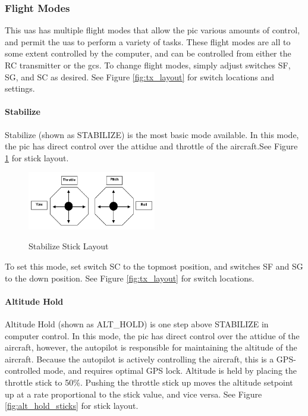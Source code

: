 \documentclass{report}
\begin{document}
			\subsubsection{Flight Modes}
				This \gls{uas} has multiple flight modes that allow the \gls{pic} various amounts of control, and permit the \gls{uas} to perform a variety of tasks.  These flight modes are all to some extent controlled by the computer, and can be controlled from either the RC transmitter or the \gls{gcs}.  To change flight modes, simply adjust switches SF, SG, and SC as desired.  See Figure \ref{fig:tx_layout} for switch locations and settings.
				\paragraph{Stabilize}
					Stabilize (shown as STABILIZE) is the most basic mode available.  In this mode, the \gls{pic} has direct control over the attidue and throttle of the aircraft.See Figure \ref{fig:stabilize_sticks} for stick layout.

					\begin{figure}[ht]
						\centering
						\caption{Stabilize Stick Layout}
						\includegraphics[width=0.5\textwidth]{stabilize_stick_layout.png}
						\label{fig:stabilize_sticks}
					\end{figure}

					To set this mode, set switch SC to the topmost position, and switches SF and SG to the down position.  See Figure \ref{fig:tx_layout} for switch locations.
				\paragraph{Altitude Hold}
					Altitude Hold (shown as ALT\_HOLD) is one step above STABILIZE in computer control.  In this mode, the \gls{pic} has direct control over the attidue of the aircraft, however, the autopilot is responsible for maintaining the altitude of the aircraft.  Because the autopilot is actively controlling the aircraft, this is a GPS-controlled mode, and requires optimal GPS lock.  Altitude is held by placing the throttle stick to 50\%.  Pushing the throttle stick up moves the altitude setpoint up at a rate proportional to the stick value, and vice versa.  See Figure \ref{fig:alt_hold_sticks} for stick layout.
\end{document}
